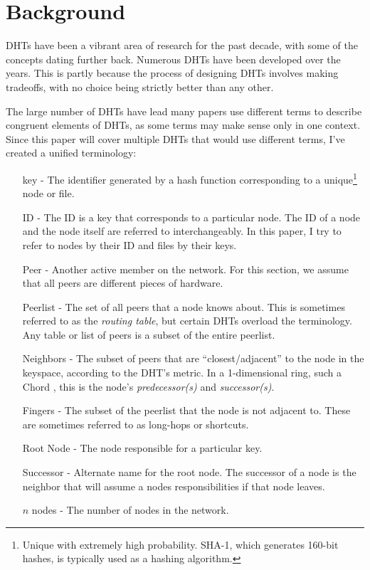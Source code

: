 \chapter{Background}
\label{chapter:background}

DHTs have been a vibrant area of research for the past decade, with some of the concepts dating further back.
Numerous DHTs have been developed over the years.
This is partly because the process of designing DHTs involves making tradeoffs, with no choice being strictly better than any other.

The large number of DHTs have lead many papers use different terms to describe congruent elements of DHTs, as some terms may make sense only in one context.
Since this paper will cover multiple DHTs that would use different terms,  I've created a unified terminology:


\begin{enumerate}
    \item[key] -  The identifier generated by a hash function corresponding to a unique\footnote{Unique with extremely high probability. SHA-1, which generates 160-bit hashes, is typically used as a hashing algorithm.} node or file.
    \item[ID] - The ID is a key that corresponds to a particular node.  
    The ID of a node and the node itself are referred to interchangeably.
    In this paper, I try to refer to nodes by their ID and files by their keys.
	\item[Peer]  - Another active member on the network.  
    For this section, we assume that all peers are different pieces of hardware.
	\item[Peerlist] -  The set of all peers that a node knows about.  
    This is sometimes referred to as the \textit{routing table}, but certain DHTs \cite{tapestry} \cite{pastry} overload the terminology.
    Any table or list of peers is a subset of the entire peerlist.
	\item[Neighbors] - The subset of peers that are ``closest/adjacent'' to the node in the keyspace, according to the DHT's metric.  In a 1-dimensional ring, such a Chord \cite{chord}, this is the node's \textit{predecessor(s)} and \textit{successor(s)}.
	\item[Fingers] - The subset of the peerlist that the node is not adjacent to.  
    These are sometimes referred to as long-hops or shortcuts.
	\item[Root Node] - The node responsible for a particular key. 
	\item[Successor] -  Alternate name for the root node. 
	The successor of a node is the neighbor that will assume a nodes responsibilities if that node leaves. 
    \item[$n$ nodes] -  The number of nodes in the network.
    
\end{enumerate}


